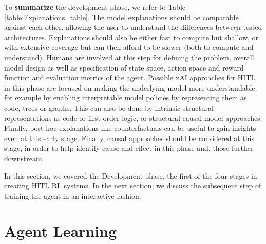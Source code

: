 \documentclass[twoside,11pt]{article}
\begin{document}
\begin{enumerate}
\noindent To \textbf{summarize} the development phase, we refer to Table \ref{table:Explanations_table}. The model explanations should be comparable against each other, allowing the user to understand the differences between tested architectures. Explanations should also be either fast to compute but shallow, or with extensive coverage but can then afford to be slower (both to compute and understand). Humans are involved at this step for defining the problem, overall model design as well as specification of state space, action space and reward function and evaluation metrics of the agent. Possible xAI approaches for HITL in this phase are focused on making the underlying model more understandable, for example by enabling interpretable model policies by representing them as code, trees or graphs. This can also be done by intrinsic structural representations as code or first-order logic, or structural causal model approaches. Finally, post-hoc explanations like counterfactuals can be useful to gain insights even at this early stage. Finally, causal approaches should be considered at this stage, in order to help identify cause and effect in this phase and, those further downstream.

In this section, we covered the Development phase, the first of the four stages in creating HITL RL systems. In the next section, we discuss the subsequent step of training the agent in an interactive fashion.

\section{Agent Learning}
\label{sec:AgentLearning}


\end{enumerate}
\end{document}
